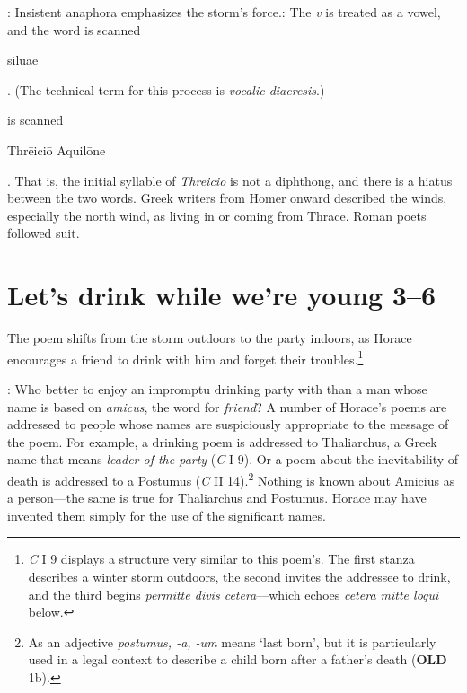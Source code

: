 
: Insistent anaphora emphasizes the storm's force.\indent{}: The \textit{v} is treated as a vowel, and the word is scanned \begin{metrica}s\-il\-u\=ae\end{metrica}.  (The technical term for this process is \textit{vocalic diaeresis}.)


 is scanned \begin{metrica}Thr\=e\-ic\-i\=o \-Aqu\-il\=on\-e\end{metrica}.  That is, the initial syllable of \textit{Threicio} is not a diphthong, and there is a hiatus between the two words.  Greek writers from Homer onward described the winds, especially the north wind, as living in or coming from Thrace.  Roman poets followed suit.


\section*{Let's drink while we're young 3--6}

The poem shifts from the storm outdoors to the party indoors, as Horace encourages a friend to drink with him and forget their troubles.\footnote{\textit{C} I 9 displays a structure very similar to this poem's.  The first stanza describes a winter storm outdoors, the second invites the addressee to drink, and the third begins \textit{permitte divis cetera}---which echoes \textit{cetera mitte loqui} below.}


: Who better to enjoy an impromptu drinking party with than a man whose name is based on \textit{amicus}, the word for \textit{friend}?  A number of Horace's poems are addressed to people whose names are suspiciously appropriate to the message of the poem.  For example,  a drinking poem is addressed to Thaliarchus, a Greek name that means \textit{leader of the party} (\textit{C} I 9).  Or a poem about the inevitability of death is addressed to a Postumus (\textit{C} II 14).\footnote{As an adjective \textit{postumus, -a, -um} means `last born', but it is particularly used in a legal context to describe a child born after a father's death (\textbf{OLD} 1b).}  Nothing is known about Amicius as a person---the same is true for Thaliarchus and Postumus.  Horace may have invented them simply for the use of the significant names.

